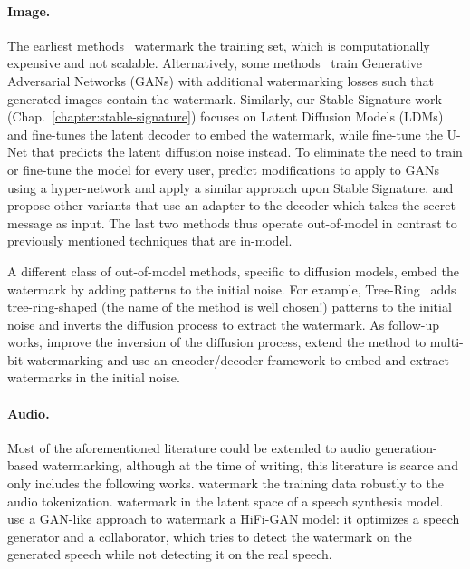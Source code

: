\paragraph*{Image.} 
The earliest methods~\citep{wu2020watermarking, yu2021artificial, zhao2023recipe} watermark the training set, which is computationally expensive and not scalable.
Alternatively, some methods~\citep{fei2022supervised, fei2024wide} train Generative Adversarial Networks (\Glspl*{GAN}) with additional watermarking losses such that generated images contain the watermark. 
Similarly, our Stable Signature work (Chap.~\ref{chapter:stable-signature}) focuses on Latent Diffusion Models (\Glspl*{LDM}) and fine-tunes the latent decoder to embed the watermark, while \cite{feng2024aqualora} fine-tune the U-Net that predicts the latent diffusion noise instead.
To eliminate the need to train or fine-tune the model for every user, \cite{yu2022responsible, fei2023robust} predict modifications to apply to GANs using a hyper-network and \cite{kim2024wouaf} apply a similar approach upon Stable Signature. 
\cite{ci2024wmadapter} and \cite{rezaei2024lawa} propose other variants that use an adapter to the decoder which takes the secret message as input.
The last two methods thus operate out-of-model in contrast to previously mentioned techniques that are in-model.

A different class of out-of-model methods, specific to diffusion models, embed the watermark by adding patterns to the initial noise. 
For example, Tree-Ring~\citep{wen2023tree} adds tree-ring-shaped (the name of the method is well chosen!) patterns to the initial noise and inverts the diffusion process to extract the watermark. 
As follow-up works, \cite{hong2024exact} improve the inversion of the diffusion process, \cite{ci2024ringid} extend the method to multi-bit watermarking and \cite{lei2024diffusetrace} use an encoder/decoder framework to embed and extract watermarks in the initial noise.

\paragraph*{Audio.} 
Most of the aforementioned literature could be extended to audio generation-based watermarking, although at the time of writing, this literature is scarce and only includes the following works.
\cite{san2024latent} watermark the training data robustly to the audio tokenization.
\cite{zhou2024traceablespeech} watermark in the latent space of a speech synthesis model.
\cite{juvela2023collaborative} use a GAN-like approach to watermark a HiFi-GAN model: it optimizes a speech generator and a collaborator, which tries to detect the watermark on the generated speech while not detecting it on the real speech.

